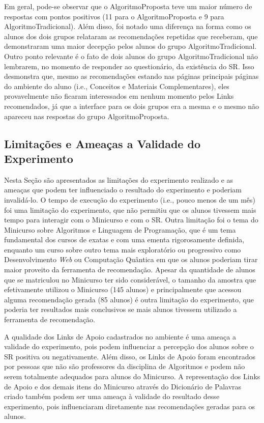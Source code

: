 Em geral, pode-se observar que o AlgoritmoProposta teve um maior número de respostas com pontos positivos (11 para
o AlgoritmoProposta e 9 para AlgoritmoTradicional). Além disso, foi notado uma diferença na forma como os alunos dos
dois grupos relataram as  recomendações repetidas que receberam, que demonstraram uma maior decepção pelos alunos
do grupo AlgoritmoTradicional. Outro ponto relevante é o fato de dois alunos do grupo AlgoritmoTradicional não lembrarem,
no momento de responder ao questionário, da existência do SR. Isso desmonstra que, mesmo as recomendações estando nas
páginas principais páginas do ambiente do aluno (i.e., Conceitos e Materiais Complementares), eles provavelmente não
ficaram interessados em nenhum momento pelos Links recomendados, já que a interface para os dois grupos era a mesma e o
mesmo não apareceu nas respostas do grupo AlgoritmoProposta.

\subsection{Limitações e Ameaças a Validade do Experimento}\label{subsection:ameacas-a-validade}

Nesta Seção são apresentados as limitações do experimento realizado e as ameaças que podem ter influenciado o resultado
do experimento e poderiam invalidá-lo. O tempo de execução do experimento (i.e., pouco menos de um mês) foi uma limitação do experimento, que não permitiu que
os alunos tivessem mais tempo para interagir com o Minicurso e com o SR. Outra limitação foi o tema do Minicurso sobre
Algoritmos e Linguagem de Programação, que é um tema fundamental dos cursos de exatas e com uma ementa rigorosamente
definida, enquanto um curso sobre outro tema mais exploratório ou progressivo como Desenvolvimento \textit{Web} ou
Computação Quântica em que os alunos poderiam tirar maior proveito da ferramenta de recomendação. Apesar da quantidade
de alunos que se matriculou no Minicurso ter sido considerável, o tamanho da amostra que efetivamente utilizou o Minicurso
(145 alunos) e principalmente que acessou alguma recomendação gerada (85 alunos) é outra limitação do
experimento, que poderia ter resultados mais conclusivos se mais alunos tivessem utilizado a ferramenta de recomendação.

A qualidade dos Links de Apoio cadastrados no ambiente \adaptwebspace é uma ameaça a validade do experimento, pois podem
influenciar a percepção dos alunos sobre o SR positiva ou negativamente. Além disso, os Links de Apoio foram encontrados
por pessoas que não são professores da disciplina de Algoritmos e podem não serem totalmente adequados para alunos do Minicurso.
A representação dos Links de Apoio e dos demais itens do Minicurso através do Dicionário de Palavras criado também
podem ser uma ameaça à validade do resultado desse experimento, pois influenciaram diretamente nas recomendações geradas
para os alunos.

